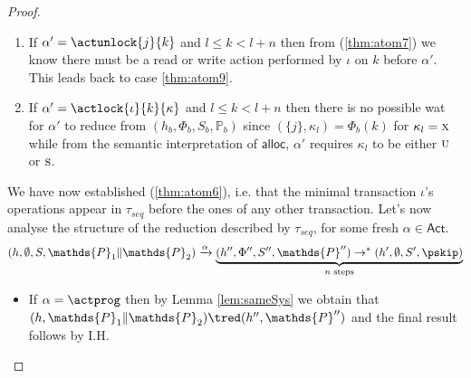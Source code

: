 \begin{thm}
{\begin{proof}
\begin{enumerate}[label=({\roman*})]
	\item If $\alpha' = \actunlock{j}{k}$ and $l \leq k < l + n$ then from (\ref{thm:atom7}) we know there must be a \textsf{read} or \textsf{write} action performed by $\iota$ on $k$ before $\alpha'$. This leads back to case \ref{thm:atom9}.
	
	\item If $\alpha' = \actlock{\iota}{k}{\kappa}$ and $l \leq k < l + n$ then there is no possible wat for $\alpha'$ to reduce from $(h_b, \Phi_b, S_b, \mathds{P}_b)$ since $(\{j\}, \kappa_l) = \Phi_b(k)$ for $\kappa_l = \textsc{x}$ while from the semantic interpretation of $\mathsf{alloc}$, $\alpha'$ requires $\kappa_l$ to be either $\textsc{u}$ or $\textsc{s}$.
\end{enumerate}

We have now established (\ref{thm:atom6}), i.e. that the minimal transaction $\iota$'s operations appear in $\tau_{seq}$ before the ones of any other transaction. Let's now analyse the structure of the reduction described by $\tau_{seq}$, for some fresh $\alpha \in \mathsf{Act}$.
\[
	(h, \emptyset, S, \mathds{P}_1 \| \mathds{P}_2) \xrightarrow{\alpha}
	\underbrace{(h'', \Phi'', S'', \mathds{P}'') \rightarrow^* (h', \emptyset, S', \pskip)}_{n \text{ steps}}
\]
\begin{itemize}
	\item If $\alpha = \actprog$ then by Lemma \ref{lem:sameSys} we obtain that $(h, \mathds{P}_1 \| \mathds{P}_2) \tred (h'', \mathds{P}'')$ and the final result follows by I.H.
	

\end{itemize}
\end{proof}}
\end{thm}
